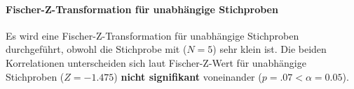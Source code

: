 \documentclass[a4paper,11pt]{article}%
\renewcommand{\\}{\vspace*{0.5\baselineskip} \newline}
\begin{document}
\paragraph{Fischer-Z-Transformation für unabhängige Stichproben}
Es wird eine Fischer-Z-Transformation für unabhängige Stichproben durchgeführt, obwohl die Stichprobe mit ($N=5$) sehr klein ist.
Die beiden Korrelationen unterscheiden sich laut Fischer-Z-Wert für unabhängige Stichproben ($Z=-1.475$) \textbf{nicht signifikant} voneinander ($p =.07 < \alpha = 0.05$).
%
%
%
\end{document}
